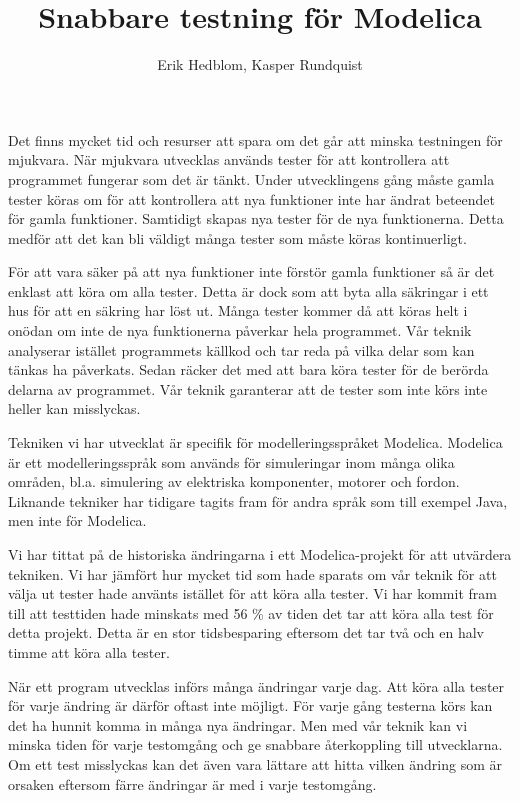 \documentclass{popsci}
\author{Erik Hedblom, Kasper Rundquist}
\title{Snabbare testning för Modelica}
\begin{document}


{\noindent Det finns mycket tid och resurser att spara om det går att minska testningen för mjukvara. När mjukvara utvecklas används tester för att kontrollera att programmet fungerar som det är tänkt. Under utvecklingens gång måste gamla tester köras om för att kontrollera att nya funktioner inte har ändrat beteendet för gamla funktioner. Samtidigt skapas nya tester för de nya funktionerna. Detta medför att det kan bli väldigt många tester som måste köras kontinuerligt.

För att vara säker på att nya funktioner inte förstör gamla funktioner så är det enklast att köra om alla tester. Detta är dock som att byta alla säkringar i ett hus för att en säkring har löst ut. Många tester kommer då att köras helt i onödan om inte de nya funktionerna påverkar hela programmet. Vår teknik analyserar istället programmets källkod och tar reda på vilka delar som kan tänkas ha påverkats. Sedan räcker det med att bara köra tester för de berörda delarna av programmet. Vår teknik garanterar att de tester som inte körs inte heller kan misslyckas.

Tekniken vi har utvecklat är specifik för modelleringsspråket Modelica. Modelica är ett modelleringsspråk som används för simuleringar inom många olika områden, bl.a. simulering av elektriska komponenter, motorer och fordon. Liknande tekniker har tidigare tagits fram för andra språk som till exempel Java, men inte för Modelica. 

Vi har tittat på de historiska ändringarna i ett Modelica-projekt för att utvärdera tekniken. Vi har jämfört hur mycket tid som hade sparats om vår teknik för att välja ut tester hade använts istället för att köra alla tester. Vi har kommit fram till att testtiden hade minskats med 56 \% av tiden det tar att köra alla test för detta projekt. Detta är en stor tidsbesparing eftersom det tar två och en halv timme att köra alla tester.

När ett program utvecklas införs många ändringar varje dag. Att köra alla tester för varje ändring är därför oftast inte möjligt. För varje gång testerna körs kan det ha hunnit komma in många nya ändringar. Men med vår teknik kan vi minska tiden för varje testomgång och ge snabbare återkoppling till utvecklarna. Om ett test misslyckas kan det även vara lättare att hitta vilken ändring som är orsaken eftersom färre ändringar är med i varje testomgång. 
}
\end{document}
